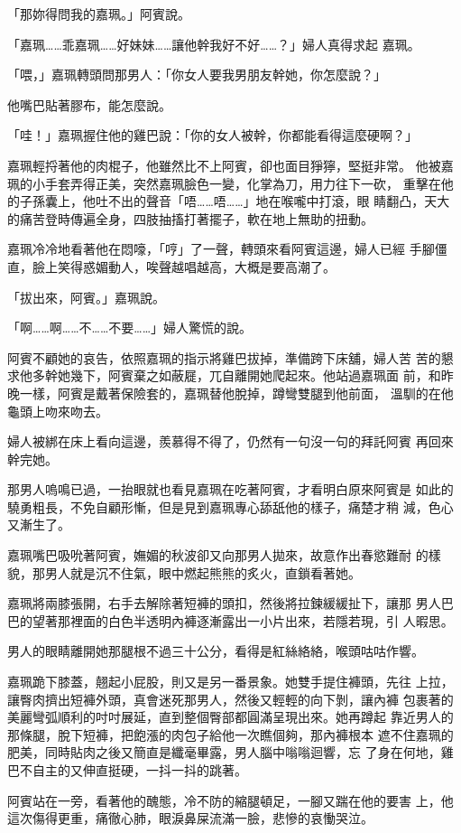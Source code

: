 「那妳得問我的嘉珮。」阿賓說。

「嘉珮……乖嘉珮……好妹妹……讓他幹我好不好……？」婦人真得求起
嘉珮。

「喂，」嘉珮轉頭問那男人：「你女人要我男朋友幹她，你怎麼說？」

他嘴巴貼著膠布，能怎麼說。

「哇！」嘉珮握住他的雞巴說：「你的女人被幹，你都能看得這麼硬啊？」

嘉珮輕捋著他的肉棍子，他雖然比不上阿賓，卻也面目猙獰，堅挺非常。
他被嘉珮的小手套弄得正美，突然嘉珮臉色一變，化掌為刀，用力往下一砍，
重擊在他的子孫囊上，他吐不出的聲音「唔……唔……」地在喉嚨中打滾，眼
睛翻凸，天大的痛苦登時傳遍全身，四肢抽搐打著擺子，軟在地上無助的扭動。

嘉珮冷冷地看著他在悶嚎，「哼」了一聲，轉頭來看阿賓這邊，婦人已經
手腳僵直，臉上笑得惑媚動人，唉聲越唱越高，大概是要高潮了。

「拔出來，阿賓。」嘉珮說。

「啊……啊……不……不要……」婦人驚慌的說。

阿賓不顧她的哀告，依照嘉珮的指示將雞巴拔掉，準備跨下床舖，婦人苦
苦的懇求他多幹她幾下，阿賓棄之如蔽屣，兀自離開她爬起來。他站過嘉珮面
前，和昨晚一樣，阿賓是戴著保險套的，嘉珮替他脫掉，蹲彎雙腿到他前面，
溫馴的在他龜頭上吻來吻去。

婦人被綁在床上看向這邊，羨慕得不得了，仍然有一句沒一句的拜託阿賓
再回來幹完她。

那男人嗚鳴已過，一抬眼就也看見嘉珮在吃著阿賓，才看明白原來阿賓是
如此的驍勇粗長，不免自顧形慚，但是見到嘉珮專心舔舐他的樣子，痛楚才稍
減，色心又漸生了。

嘉珮嘴巴吸吮著阿賓，嫵媚的秋波卻又向那男人拋來，故意作出春慾難耐
的樣貌，那男人就是沉不住氣，眼中燃起熊熊的炙火，直鎖看著她。

嘉珮將兩膝張開，右手去解除著短褲的頭扣，然後將拉鍊緩緩扯下，讓那
男人巴巴的望著那裡面的白色半透明內褲逐漸露出一小片出來，若隱若現，引
人暇思。

男人的眼睛離開她那腿根不過三十公分，看得是紅絲絡絡，喉頭咕咕作響。

嘉珮跪下膝蓋，翹起小屁股，則又是另一番景象。她雙手提住褲頭，先往
上拉，讓臀肉擠出短褲外頭，真會迷死那男人，然後又輕輕的向下剝，讓內褲
包裹著的美麗彎弧順利的吋吋展延，直到整個臀部都圓滿呈現出來。她再蹲起
靠近男人的那條腿，脫下短褲，把飽漲的肉包子給他一次瞧個夠，那內褲根本
遮不住嘉珮的肥美，同時貼肉之後又簡直是纖毫畢露，男人腦中嗡嗡迴響，忘
了身在何地，雞巴不自主的又伸直挺硬，一抖一抖的跳著。

阿賓站在一旁，看著他的醜態，冷不防的縮腿頓足，一腳又踹在他的要害
上，他這次傷得更重，痛徹心肺，眼淚鼻屎流滿一臉，悲慘的哀慟哭泣。

